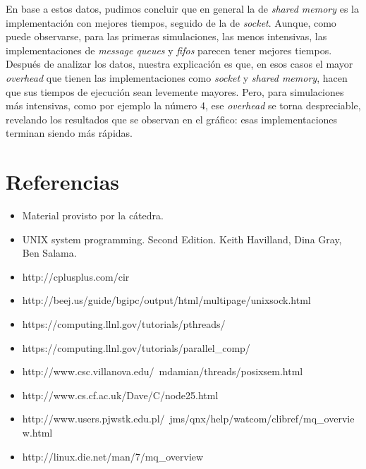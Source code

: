 \documentclass[a4paper,10pt]{article}
\begin{document}
En base a estos datos, pudimos concluir que en general la de \textit{shared memory} es la implementación con mejores tiempos, seguido de la de \textit{socket}. 
Aunque, como puede observarse, para las primeras simulaciones, las menos intensivas, las implementaciones de \textit{message queues} y \textit{fifos} parecen 
tener mejores tiempos. Después de analizar los datos, nuestra explicación es que, en esos casos el mayor \textit{overhead} que tienen las implementaciones como 
\textit{socket} y \textit{shared memory}, hacen que sus tiempos de ejecución sean levemente mayores. 
Pero, para simulaciones más intensivas, como por ejemplo la número 4, ese \textit{overhead} se torna despreciable, revelando los resultados que se observan en 
el gráfico: esas implementaciones terminan siendo más rápidas.\\

\newpage     
\section{Referencias}

\begin{itemize}
  \item Material provisto por la cátedra.
  \item UNIX system programming. Second Edition. Keith Havilland, Dina Gray, Ben Salama.
  \item http://cplusplus.com/cir
  \item http://beej.us/guide/bgipc/output/html/multipage/unixsock.html
  \item https://computing.llnl.gov/tutorials/pthreads/
  \item https://computing.llnl.gov/tutorials/parallel\_comp/
  \item http://www.csc.villanova.edu/~mdamian/threads/posixsem.html
  \item http://www.cs.cf.ac.uk/Dave/C/node25.html
  \item http://www.users.pjwstk.edu.pl/~jms/qnx/help/watcom/clibref/mq\_overview.html
  \item http://linux.die.net/man/7/mq\_overview
\end{itemize}
   
\end{document}
